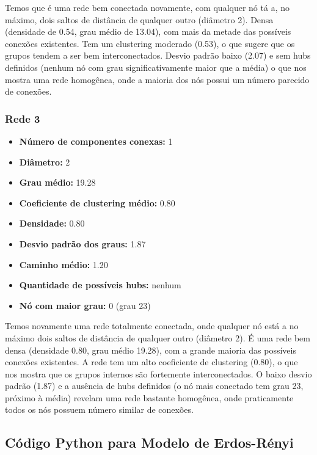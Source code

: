 \documentclass[a4paper]{article}
\begin{document}
Temos que é uma rede bem conectada novamente, com qualquer nó tá a, no máximo, dois saltos de distância de qualquer outro (diâmetro 2). Densa (densidade de 0.54, grau médio de 13.04), com mais da metade das possíveis conexões existentes. Tem um clustering moderado (0.53), o que sugere que os grupos tendem a ser bem interconectados. Desvio padrão baixo (2.07) e sem hubs definidos (nenhum nó com grau significativamente maior que a média) o que nos mostra uma rede homogênea, onde a maioria dos nós possui um número parecido de conexões. 

\subsubsection{Rede 3}
\begin{itemize}
    \item \textbf{Número de componentes conexas:} 1
    \item \textbf{Diâmetro:} 2
    \item \textbf{Grau médio:} 19.28
    \item \textbf{Coeficiente de clustering médio:} 0.80
    \item \textbf{Densidade:} 0.80
    \item \textbf{Desvio padrão dos graus:} 1.87
    \item \textbf{Caminho médio:} 1.20
    \item \textbf{Quantidade de possíveis hubs:} nenhum
    \item \textbf{Nó com maior grau:} 0 (grau 23)
\end{itemize}

Temos novamente uma rede totalmente conectada, onde qualquer nó está a no máximo dois saltos de distância de qualquer outro (diâmetro 2). É uma rede bem densa (densidade 0.80, grau médio 19.28), com a grande maioria das possíveis conexões existentes. A rede tem um alto coeficiente de clustering (0.80), o que nos mostra que os grupos internos são fortemente interconectados. O baixo desvio padrão (1.87) e a ausência de hubs definidos (o nó mais conectado tem grau 23, próximo à média) revelam uma rede bastante homogênea, onde praticamente todos os nós possuem número similar de conexões.


\vspace{0.5cm}
\subsection{Código Python para Modelo de Erdos-Rényi}
\end{document}
